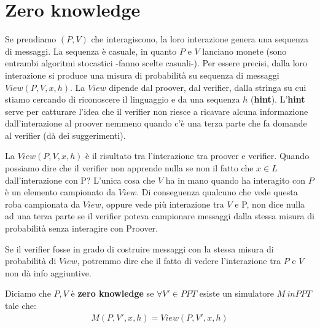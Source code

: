 \section{Zero knowledge}
Se prendiamo $(P, V)$ che interagiscono, la loro interazione genera una sequenza di messaggi. La sequenza è casuale, in quanto $P$ e $V$ lanciano monete (sono entrambi algoritmi stocastici -fanno scelte casuali-). Per essere precisi, dalla loro interazione si produce una misura di probabilità su sequenza di messaggi $View(P, V, x, h)$. La $View$ dipende dal proover, dal verifier, dalla stringa su cui stiamo cercando di riconoscere il linguaggio e da una sequenza $h$ (\textbf{hint}). L'\textbf{hint} serve per catturare l'idea che il verifier non riesce a ricavare alcuna informazione dall'interazione al proover nemmeno quando c'è una terza parte che fa domande al verifier (dà dei suggerimenti). 

La $View(P, V, x, h)$ è il risultato tra l'interazione tra proover e verifier. Quando possiamo dire che il verifier non apprende nulla se non il fatto che $x \in L$ dall'interazione con P? L'unica cosa che $V$ ha in mano quando ha interagito con $P$ è un elemento campionato da $View$. Di conseguenza qualcuno che vede questa roba campionata da $View$, oppure vede più interazione tra $V$ e P, non dice nulla ad una terza parte se il verifier poteva campionare messaggi dalla stessa misura di probabilità senza interagire con Proover. 

Se il verifier fosse in grado di costruire messaggi con la stessa misura di probabilità di $View$, potremmo dire che il fatto di vedere l'interazione tra $P$ e $V$ non dà info aggiuntive.
\\

\begin{definition}
    Diciamo che $P, V$ è \textbf{zero knowledge} se $\forall V' \in PPT$ esiste un simulatore $M\ in PPT$ tale che: 
    \begin{align*}
        M(P, V', x, h) = View(P, V', x, h)
    \end{align*}
\end{definition}    

